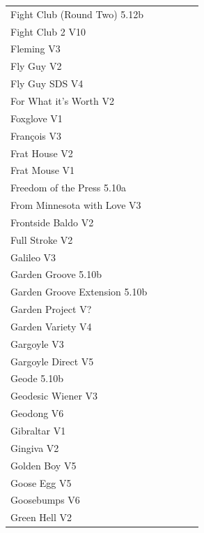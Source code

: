 \begin{flushleft}
\begin{center}
\begin{supertabular}{p{0.76\linewidth}p{0.08\linewidth}}
Fight Club (Round Two) 5.12b & \pageref{rt:Fight Club (Round Two)} \\
Fight Club 2 V10 & \pageref{rt:Fight Club 2} \\
Fleming V3 & \pageref{rt:Fleming} \\
Fly Guy V2 & \pageref{rt:Fly Guy} \\
Fly Guy SDS V4 & \pageref{vr:Fly Guy SDS} \\
For What it's Worth V2 & \pageref{rt:For What it's Worth} \\
Foxglove V1 & \pageref{rt:Foxglove} \\
François V3 & \pageref{rt:François} \\
Frat House V2 & \pageref{rt:Frat House} \\
Frat Mouse V1 & \pageref{rt:Frat Mouse} \\
Freedom of the Press 5.10a & \pageref{rt:Freedom of the Press} \\
From Minnesota with Love V3 & \pageref{rt:From Minnesota with Love} \\
Frontside Baldo V2 & \pageref{rt:Frontside Baldo} \\
Full Stroke V2 & \pageref{rt:Full Stroke} \\
Galileo V3 & \pageref{rt:Galileo} \\
Garden Groove 5.10b & \pageref{rt:Garden Groove} \\
Garden Groove Extension 5.10b & \pageref{vr:Garden Groove Extension} \\
Garden Project V? & \pageref{rt:Garden Project} \\
Garden Variety V4 & \pageref{rt:Garden Variety} \\
Gargoyle V3 & \pageref{rt:Gargoyle} \\
Gargoyle Direct V5 & \pageref{vr:Gargoyle Direct} \\
Geode 5.10b & \pageref{rt:Geode} \\
Geodesic Wiener V3 & \pageref{rt:Geodesic Wiener} \\
Geodong V6 & \pageref{vr:Geodong} \\
Gibraltar V1 & \pageref{rt:Gibraltar} \\
Gingiva V2 & \pageref{rt:Gingiva} \\
Golden Boy V5 & \pageref{rt:Golden Boy} \\
Goose Egg V5 & \pageref{rt:Goose Egg} \\
Goosebumps V6 & \pageref{rt:Goosebumps} \\
Green Hell V2 & \pageref{rt:Green Hell} \\

\end{supertabular}
\end{center}
\end{flushleft}
